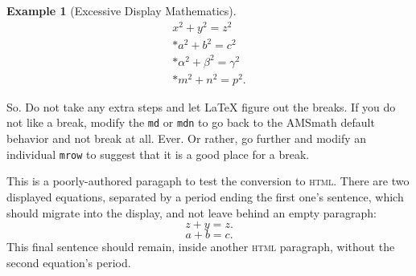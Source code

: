 \documentclass{amsart}
\theoremstyle{plain}%
\theoremstyle{definition}%
\newtheorem{example}[theorem]{Example}
\theoremstyle{remark}%
\newcommand{\mono}[1]{\texttt{#1}}
\newcommand{\initialism}[1]{\textsc{\MakeLowercase{#1}}}
\numberwithin{equation}{section}
\begin{document}
\begin{example}[Excessive Display Mathematics]
\begin{gather}
x^2+y^2=z^2\label{section-mathematics-4-9-3-2-45}\\*
a^2+b^2=c^2\label{section-mathematics-4-9-3-2-46}\\*
\alpha^2+\beta^2=\gamma^2\label{section-mathematics-4-9-3-2-47}\\*
m^2+n^2=p^2\text{.}\label{section-mathematics-4-9-3-2-48}
\end{gather}
%
\par
So.  Do not take any extra steps and let \LaTeX{} figure out the breaks.  If you do not like a break, modify the \mono{md} or \mono{mdn} to go back to the AMSmath default behavior and not break at all.  Ever.  Or rather, go further and modify an individual \mono{mrow} to suggest that it is a good place for a break.%
\end{example}
This is a poorly-authored paragaph to test the conversion to \initialism{HTML}.  There are two displayed equations, separated by a period ending the first one's sentence, which should migrate into the display, and not leave behind an empty paragraph:%
\begin{equation*}
z+y = z\text{.}
\end{equation*}
%
\begin{equation*}
a + b = c\text{.}
\end{equation*}
This final sentence should remain, inside another \initialism{HTML} paragraph, without the second equation's period.%
%
%
\typeout{************************************************}
\typeout{************************************************}
%
\end{document}
